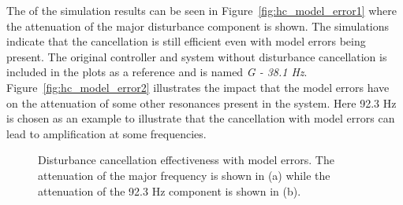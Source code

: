 The \abbrFFT of the simulation results can be seen in Figure~\ref{fig:hc_model_error1} where the attenuation of the major disturbance component is shown. The simulations indicate that the cancellation is still efficient even with model errors being present. The original controller and system without disturbance cancellation is included in the plots as a reference and is named \emph{G - 38.1 Hz}. Figure~\ref{fig:hc_model_error2} illustrates the impact that the model errors have on the attenuation of some other resonances present in the system. Here 92.3 Hz is chosen as an example to illustrate that the cancellation with model errors can lead to amplification at some frequencies.


\begin{figure}[h!]
  \centering %
  \qquad
  \caption{\label{fig:hc_model_error} Disturbance cancellation effectiveness with model errors. The attenuation of the major frequency is shown in (a) while the attenuation of the 92.3 Hz component is shown in (b).}
\end{figure}

